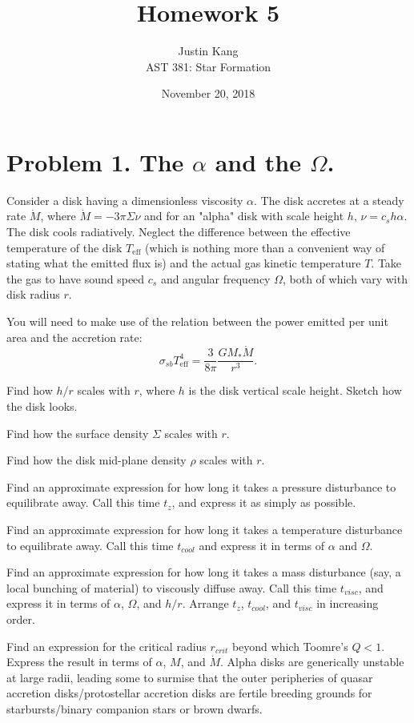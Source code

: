 \documentclass[11pt]{article}
\title{\vspace{-2.5em} \textbf{Homework 5}}
\author{Justin Kang \\ AST 381: Star Formation}
\date{\vspace{-0.75em} November 20, 2018}
\newenvironment{tight_enumerate}{
    \begin{enumerate}[label=(\alph*)]
    \setlength{\itemsep}{3pt}
    \setlength{\parskip}{0pt}}
    {\end{enumerate}}
\begin{document}
\maketitle
\singlespacing
{}
\sloppy


\vspace{-2.5em}
\section*{Problem 1. The $\alpha$ and the $\Omega$.}
Consider a disk having a dimensionless viscosity $\alpha$. The disk accretes at a steady rate $\dot{M}$, where $\dot{M} = -3\pi\Sigma\nu$ and for an "alpha" disk with scale height $h$, $\nu = c_{s}h\alpha$. The disk cools radiatively. Neglect the difference between the effective temperature of the disk $T_\text{eff}$ (which is nothing more than a convenient way of stating what the emitted flux is) and the actual gas kinetic temperature $T$. Take the gas to have sound speed $c_s$ and angular frequency $\Omega$, both of which vary with disk radius $r$.

You will need to make use of the relation between the power emitted per unit area and the accretion rate:
\[\sigma_{sb}T_\text{eff}^{4} = \frac{3}{8\pi}\frac{GM_{*}\dot{M}}{r^{3}}.\]

\begin{tight_enumerate}
\item Find how $h/r$ scales with $r$, where $h$ is the disk vertical scale height. Sketch how the disk looks.

\item Find how the surface density $\Sigma$ scales with $r$. 

\item Find how the disk mid-plane density $\rho$ scales with $r$. 

\item Find an approximate expression for how long it takes a pressure disturbance to equilibrate away. Call this time $t_z$, and express it as simply as possible.

\item Find an approximate expression for how long it takes a temperature disturbance to equilibrate away. Call this time $t_{cool}$ and express it in terms of $\alpha$ and $\Omega$.

\item Find an approximate expression for how long it takes a mass disturbance (say, a local bunching of material) to viscously diffuse away. Call this time $t_{visc}$, and express it in terms of $\alpha$, $\Omega$, and $h/r$. Arrange $t_z$, $t_{cool}$, and $t_{visc}$ in increasing order.

\item Find an expression for the critical radius $r_{crit}$ beyond which Toomre's $Q < 1$. Express the result in terms of $\alpha$, $M$, and $\dot{M}$. Alpha disks are generically unstable at large radii, leading some to surmise that the outer peripheries of quasar accretion disks/protostellar accretion disks are fertile breeding grounds for starbursts/binary companion stars or brown dwarfs.
\end{tight_enumerate}
\end{document}
